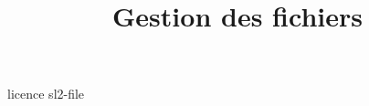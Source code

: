 \documentclass [xcolor=table] {beamer}
\title {Gestion des fichiers}
\begin{document}
 {licence}
 {sl2-file}
\end{document}
